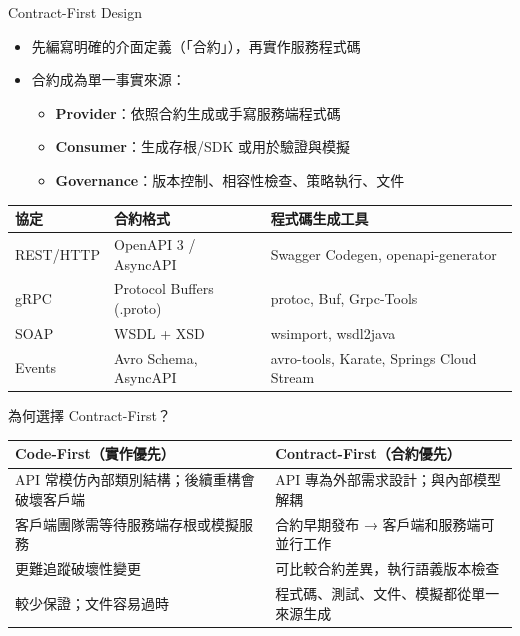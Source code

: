 \documentclass[UTF8]{beamer}
\begin{document}
\begin{frame}{Contract-First Design}
    \begin{itemize}
        \item 先編寫明確的介面定義（「合約」），再實作服務程式碼
        \item 合約成為單一事實來源：
              \begin{itemize}
                  \item \textbf{Provider}：依照合約生成或手寫服務端程式碼
                  \item \textbf{Consumer}：生成存根/SDK 或用於驗證與模擬
                  \item \textbf{Governance}：版本控制、相容性檢查、策略執行、文件
              \end{itemize}
    \end{itemize}
    \tiny
    \begin{center}
        \begin{tabular}{|l|l|l|}
            \hline
            \textbf{協定} & \textbf{合約格式}         & \textbf{程式碼生成工具}                  \\
            \hline
            REST/HTTP     & OpenAPI 3 / AsyncAPI      & Swagger Codegen, openapi-generator       \\
            \hline
            gRPC          & Protocol Buffers (.proto) & protoc, Buf, Grpc-Tools                  \\
            \hline
            SOAP          & WSDL + XSD                & wsimport, wsdl2java                      \\
            \hline
            Events        & Avro Schema, AsyncAPI     & avro-tools, Karate, Springs Cloud Stream \\
            \hline
        \end{tabular}
    \end{center}
\end{frame}

\begin{frame}{為何選擇 Contract-First？}
    \begin{center}
        \begin{tabular}{|p{}|p{}|}
            \hline
            \textbf{Code-First（實作優先）}              & \textbf{Contract-First（合約優先）}      \\
            \hline
            API 常模仿內部類別結構；後續重構會破壞客戶端 & API 專為外部需求設計；與內部模型解耦     \\
            \hline
            客戶端團隊需等待服務端存根或模擬服務         & 合約早期發布 → 客戶端和服務端可並行工作  \\
            \hline
            更難追蹤破壞性變更                           & 可比較合約差異，執行語義版本檢查         \\
            \hline
            較少保證；文件容易過時                       & 程式碼、測試、文件、模擬都從單一來源生成 \\
            \hline
        \end{tabular}
    \end{center}
\end{frame}
\end{document}
